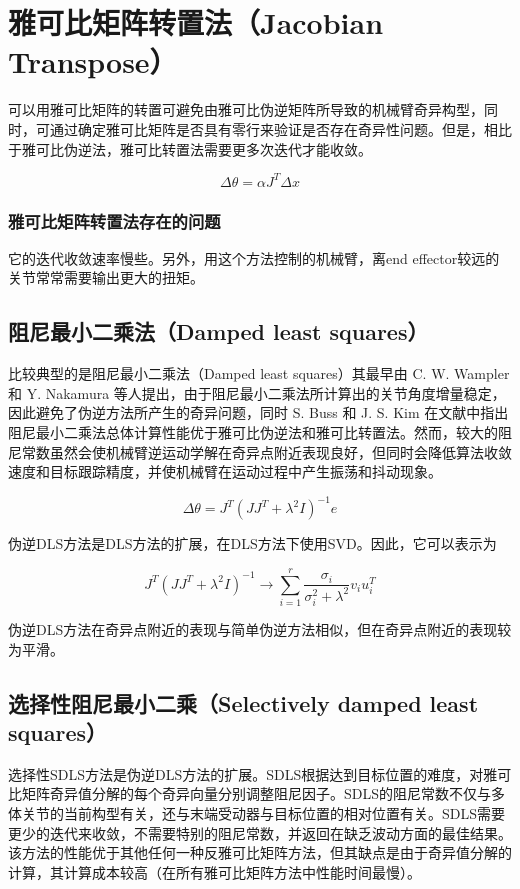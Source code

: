 \section{雅可比矩阵转置法（Jacobian Transpose）}
可以用雅可比矩阵的转置可避免由雅可比伪逆矩阵所导致的机械臂奇异构型，同时，可通过确定雅可比矩阵是否具有零行来验证是否存在奇异性问题。但是，相比于雅可比伪逆法，雅可比转置法需要更多次迭代才能收敛。
\begin{theorembox}
	\begin{equation*}
  \Delta \theta = \alpha J^T\Delta x
\end{equation*}
\end{theorembox}
\subsubsection{雅可比矩阵转置法存在的问题}
它的迭代收敛速率慢些。另外，用这个方法控制的机械臂，离end effector较远的关节常常需要输出更大的扭矩。
\subsection{阻尼最小二乘法（Damped least squares）}
比较典型的是阻尼最小二乘法（Damped least squares）其最早由 C. W. Wampler 和 Y. Nakamura 等人提出，由于阻尼最小二乘法所计算出的关节角度增量稳定，因此避免了伪逆方法所产生的奇异问题，同时 S. Buss 和 J. S. Kim 在文献中指出阻尼最小二乘法总体计算性能优于雅可比伪逆法和雅可比转置法。然而，较大的阻尼常数虽然会使机械臂逆运动学解在奇异点附近表现良好，但同时会降低算法收敛速度和目标跟踪精度，并使机械臂在运动过程中产生振荡和抖动现象。
\begin{theorembox}
	\begin{equation*}
  \Delta \theta = J^T(JJ^T+ \lambda ^2I)^{-1}e
\end{equation*}
\end{theorembox}
伪逆DLS方法是DLS方法的扩展，在DLS方法下使用SVD。因此，它可以表示为
\begin{theorembox}
	\begin{equation*}
  J^T(JJ^T+ \lambda ^2I)^{-1} \longrightarrow \sum^{r}_{i=1}\frac{\sigma_i}{\sigma _i ^2+\lambda ^2}v_iu_i^T
\end{equation*}

\end{theorembox}

伪逆DLS方法在奇异点附近的表现与简单伪逆方法相似，但在奇异点附近的表现较为平滑。

\subsection{选择性阻尼最小二乘（Selectively damped least squares）}
选择性SDLS方法是伪逆DLS方法的扩展。SDLS根据达到目标位置的难度，对雅可比矩阵奇异值分解的每个奇异向量分别调整阻尼因子。SDLS的阻尼常数不仅与多体关节的当前构型有关，还与末端受动器与目标位置的相对位置有关。SDLS需要更少的迭代来收敛，不需要特别的阻尼常数，并返回在缺乏波动方面的最佳结果。该方法的性能优于其他任何一种反雅可比矩阵方法，但其缺点是由于奇异值分解的计算，其计算成本较高（在所有雅可比矩阵方法中性能时间最慢）。

